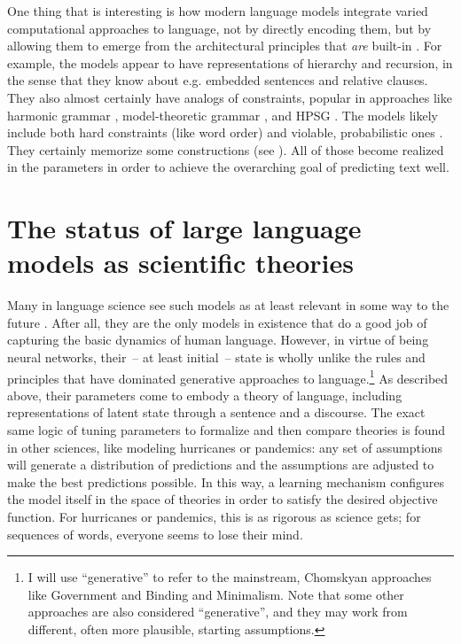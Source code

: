 \documentclass[output=paper,colorlinks,citecolor=brown]{langscibook}
\begin{document}
One thing that is interesting is how modern language models integrate varied computational approaches to language, not by directly encoding them, but by allowing them to emerge \citep{manning2020emergent,mcclelland2010emergence} from the architectural principles that \textit{are} built-in \citep{elman1996rethinking}. For example, the models appear to have representations of hierarchy \citep{manning2020emergent} and recursion, in the sense that they know about e.g. embedded sentences and relative clauses. They also almost certainly have analogs of constraints, popular in approaches like harmonic grammar \citep{smolensky2006harmonic,prince1997optimality}, model-theoretic grammar \citep{pullum2007evolution,pullum2013central,muller2023grammatical}, and HPSG \citep{muller2021head,dalrymple2022handbook}. 
The models likely include both hard constraints (like word order) and violable, probabilistic ones \citep{rumelhart1986learning}. They certainly memorize some constructions \citep{adele1995constructions,sag2012sign,jackendoff2013constructions,goldberg2006constructions,goldberg2003constructions,tomasello2000item,edelman2007behavioral} (see \citealt{chang2023speak}). All of those become realized in the parameters in order to achieve the overarching goal of predicting text well.


\section{The status of large language models as scientific theories}\largerpage

Many in language science see such models as at least relevant in some way to the future \citep{bommasani2021opportunities,baroni2022proper,pater2019generative}. After all, they are the only  models in existence that do a good job of capturing the basic dynamics of human language. However, in virtue of being neural networks, their~-- at least initial~-- state is wholly unlike the rules and principles that have dominated generative approaches to language.\footnote{I will use ``generative'' to refer to the mainstream, Chomskyan approaches like Government and Binding and Minimalism. Note that some other approaches are also considered ``generative'', and they may work from different, often more plausible, starting assumptions.} As described above, their parameters come to embody a theory of language, including representations of latent state through a sentence and a discourse. The exact same logic of tuning parameters to formalize and then compare theories is found in other sciences, like modeling hurricanes or pandemics: any set of assumptions will generate a distribution of predictions and the assumptions are adjusted to make the best predictions possible. In this way, a learning mechanism configures the model itself in the space of theories in order to satisfy the desired objective function. For hurricanes or pandemics, this is as rigorous as science gets; for sequences of words, everyone seems to lose their mind.
\end{document}
